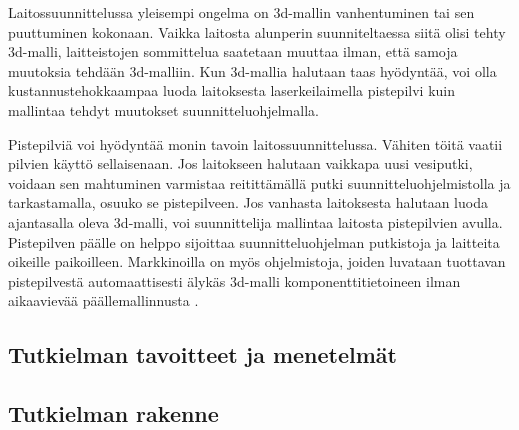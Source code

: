 Laitossuunnittelussa yleisempi ongelma on 3d-mallin vanhentuminen tai sen puuttuminen kokonaan. Vaikka laitosta alunperin suunniteltaessa siitä olisi tehty 3d-malli, laitteistojen sommittelua saatetaan muuttaa ilman, että samoja muutoksia tehdään 3d-malliin. Kun 3d-mallia halutaan taas hyödyntää, voi olla kustannustehokkaampaa luoda laitoksesta laserkeilaimella pistepilvi kuin mallintaa tehdyt muutokset suunnitteluohjelmalla. \cite{Piipponen}

Pistepilviä voi hyödyntää monin tavoin laitossuunnittelussa. Vähiten töitä vaatii pilvien käyttö sellaisenaan. Jos laitokseen halutaan vaikkapa uusi vesiputki, voidaan sen mahtuminen varmistaa reitittämällä putki suunnitteluohjelmistolla ja tarkastamalla, osuuko se pistepilveen. Jos vanhasta laitoksesta halutaan luoda ajantasalla oleva 3d-malli, voi suunnittelija mallintaa laitosta pistepilvien avulla. Pistepilven päälle on helppo sijoittaa suunnitteluohjelman putkistoja ja laitteita oikeille paikoilleen. Markkinoilla on myös ohjelmistoja, joiden luvataan tuottavan pistepilvestä automaattisesti älykäs 3d-malli komponenttitietoineen ilman aikaavievää päällemallinnusta \cite{aveva}.


\subsection{Tutkielman tavoitteet ja menetelmät}

\subsection{Tutkielman rakenne}